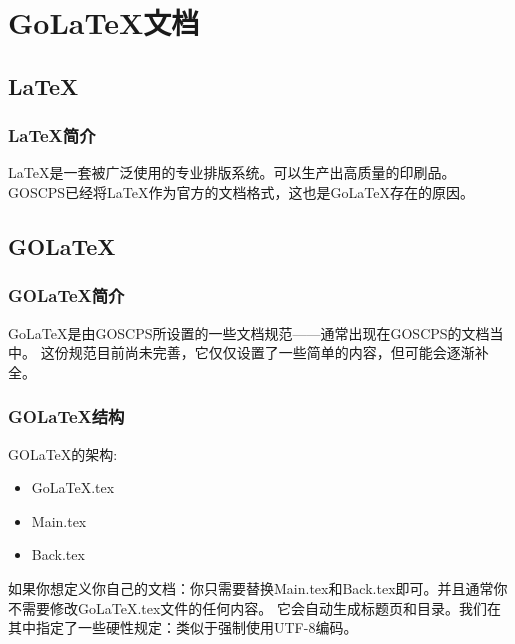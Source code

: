 \chapter{Go\LaTeX{}文档}
\section{\LaTeX{}}
\subsection{\LaTeX{}简介}

\LaTeX{}是一套被广泛使用的专业排版系统。可以生产出高质量的印刷品。
GOSCPS已经将\LaTeX{}作为官方的文档格式，这也是Go\LaTeX{}存在的原因。

\section{GO\LaTeX{}}
\subsection{GO\LaTeX{}简介}
Go\LaTeX{}是由GOSCPS所设置的一些文档规范——通常出现在G\-OS\-CP\-S的文档当中。
这份规范目前尚未完善，它仅仅设置了一些简单的内容，但可能会逐渐补全。

\subsection{GO\LaTeX{}结构}
GO\LaTeX{}的架构:

\begin{itemize}
    \item Go\LaTeX{}.tex
    \item Main.tex
    \item Back.tex
\end{itemize}

如果你想定义你自己的文档：你只需要替换Main.tex和Back.tex即可。并且通常你不需要修改Go\LaTeX{}.tex文件的任何内容。
它会自动生成标题页和目录。我们在其中指定了一些硬性规定：类似于强制使用UTF-8编码。